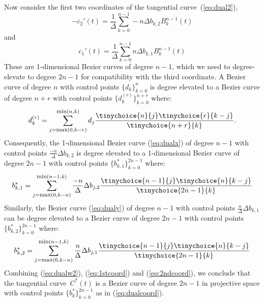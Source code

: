 \documentclass[10pt,twocolumn]{article}
\newcommand{\tang}{tangential curve\ }
\begin{document}
Now consider the first two coordinates of the \tang (\ref{eq:dual2}), 
\begin{equation}
\label{eq:dualx}
-c_2'(t) = \frac{1}{\Delta} \sum_{k=0}^{n-1} -n \Delta b_{k,2} B_k^{n-1}(t)
\end{equation}
and
\begin{equation}
\label{eq:dualy}
c_1'(t)  = \frac{1}{\Delta} \sum_{k=0}^{n-1}  n \Delta b_{k,1} B_k^{n-1}(t)
\end{equation}
These are 1-dimensional Bezier curves of degree $n-1$,
which we need to degree-elevate to degree $2n-1$
for compatibility with the third coordinate.
%
A Bezier curve of degree $n$ with control points $\{ d_k \}_{k=0}^n$ 
is degree elevated \cite{farin97} to a Bezier curve of degree $n+r$ with control points
$\{ d_k^{(r)} \}_{k=0}^{n+r}$ where:
\[
d_k^{(r)} = \sum_{j=\mbox{\footnotesize{max}}(0,k-r)}^{\mbox{\footnotesize{min}}(n,k)} 
		d_j \frac{\tinychoice{n}{j} \tinychoice{r}{k-j} }{ \tinychoice{n+r}{k} }.
\]
Consequently, the 1-dimensional Bezier curve (\ref{eq:dualx}) 
of degree $n-1$ with control points $\frac{-n}{\Delta} \Delta b_{k,2}$
is degree elevated to a 1-dimensional Bezier curve of degree $2n-1$
with control points $\{b^*_{k,1} \}_{k=0}^{2n-1}$ where:
\begin{equation}
\label{eq:1stcoord}
b^*_{k,1} = 
\sum_{j=\mbox{\footnotesize{max}}(0,k-n)}^{\mbox{\footnotesize{min}}(n-1,k)} 
	\frac{-n}{\Delta} \Delta b_{j,2}
	\frac{ \tinychoice{n-1}{j} \tinychoice{n}{k-j} }{ \tinychoice{2n-1}{k} }
\end{equation}
%
%
Similarly, the Bezier curve (\ref{eq:dualy})
of degree $n-1$ with control points $\frac{n}{\Delta} \Delta b_{k,1}$ 
can be degree elevated to a Bezier curve of degree $2n-1$ with control points 
$\{b^*_{k,2} \}_{k=0}^{2n-1}$ where:
\begin{equation}
\label{eq:2ndcoord}
b^*_{k,2} = 
\sum_{j=\mbox{\footnotesize{max}}(0,k-n)}^{\mbox{\footnotesize{min}}(n-1,k)} 
	\frac{n}{\Delta} \Delta b_{j,1}
	\frac{ \tinychoice{n-1}{j} \tinychoice{n}{k-j} }{ \tinychoice{2n-1}{k} }
\end{equation}
%
Combining (\ref{eq:dualw2}), (\ref{eq:1stcoord}) and (\ref{eq:2ndcoord}),
we conclude that the \tang $C^*(t)$
is a Bezier curve of degree $2n-1$ in projective space with control points 
$\{b^*_k\}_{k=0}^{2n-1}$ as in (\ref{eq:dualcoord}).
\QED
\end{document}

